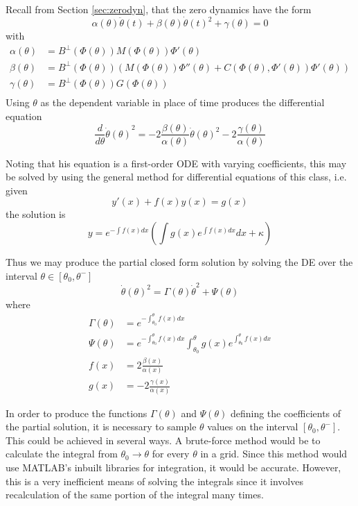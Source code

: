 Recall from Section \ref{sec:zerodyn}, that the zero dynamics have the form
\[
\alpha\left(\theta\right)\ddot{\theta}(t) + \beta\left(\theta\right)\dot{\theta}(t)^2 + \gamma\left(\theta\right) = 0
\]
with
\begin{align*}
	\alpha(\theta) &= B^{\bot}\left(\Phi(\theta)\right)M\left(\Phi(\theta)\right)\Phi'(\theta)\\
	\beta(\theta) &= B^{\bot}\left(\Phi(\theta)\right)\left(M\left(\Phi(\theta)\right)\Phi''(\theta)
	+C\left(\Phi(\theta),\Phi'(\theta)\right)\Phi'(\theta) \right)\\
	\gamma(\theta) &= B^{\bot}\left(\Phi(\theta)\right)G\left(\Phi(\theta)\right)\\
\end{align*}
Using $\theta$ as the dependent variable in place of time produces the differential equation
\[
\frac{d}{d\theta}{\dot{\theta}\left(\theta\right)}^2 = -2\frac{\beta\left(\theta\right)}
{\alpha\left(\theta\right)}\dot{\theta}\left(\theta\right)^2 - 2\frac{\gamma\left(\theta\right)}
{\alpha\left(\theta\right)}
\]

Noting that his equation is a first-order ODE with varying coefficients, this may be solved by using the general method for differential equations of this class, i.e. given
\begin{equation*}
y'(x) + f(x)y(x) = g(x)
\end{equation*}
the solution is
\begin{equation*}
y = e^{-\int f(x)dx}\left(\int g(x)e^{\int f(x)dx}dx + \kappa\right)
\end{equation*}

Thus we may produce the partial closed form solution by solving the DE over the interval $\theta \in \left[\theta_0,\theta^-\right]$
\[
\dot{\theta}\left(\theta\right)^2 = \Gamma\left(\theta\right)\dot{\theta}^2 
+ \Psi\left(\theta\right)
\]
where
\begin{subequations}
	\begin{align}
	\Gamma(\theta) &= e^{-\int_{\theta_0}^{\theta}f(x)dx} \\
	\Psi(\theta) &= e^{-\int_{\theta_0}^{\theta}f(x)dx}
	\int_{\theta_0}^{\theta}g(x)e^{\int_{\theta_0}^{\theta}f(x)dx} \\
	f(x) &= 2\frac{\beta(x)}{\alpha(x)} \\
	g(x) &= -2\frac{\gamma(x)}{\alpha(x)}
	\end{align}
\end{subequations}

In order to produce the functions $\Gamma(\theta)$ and $\Psi(\theta)$ defining the coefficients of the partial solution, it is necessary to sample $\theta$ values on the interval $\left[\theta_0,\theta^-\right]$. This could be achieved in several ways. A brute-force method would be to calculate the integral from $\theta_0\to\theta$ for every $\theta$ in a grid. Since this method would use MATLAB's inbuilt libraries for integration, it would be accurate. However, this is a very inefficient means of solving the integrals since it involves recalculation of the same portion of the integral many times.

